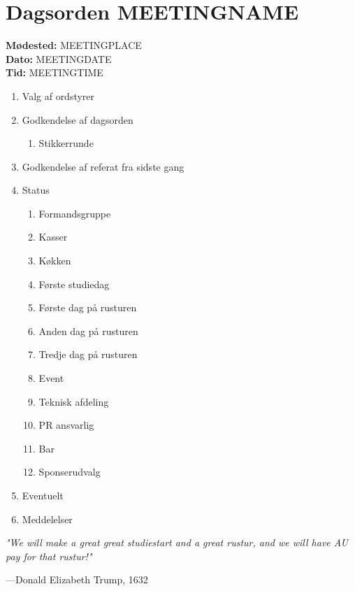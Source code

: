 

\newcommand{\meeting}{MEETINGNAME}
\newcommand{\dato}{MEETINGDATE}
\newcommand{\tid}{MEETINGTIME}
\newcommand{\location}{MEETINGPLACE}



\section*{Dagsorden \meeting{}}
\textbf{Mødested:} \location{}\\
\textbf{Dato:} \dato{}\\
\textbf{Tid:} \tid{}

\begin{enumerate}
  \item Valg af ordstyrer
  \item Godkendelse af dagsorden
  \begin{enumerate}
    \item Stikkerrunde
  \end{enumerate}
  \item Godkendelse af referat fra sidste gang
  \item Status
  \begin{enumerate}
    \item Formandsgruppe
    \item Kasser
    \item Køkken
    \item Første studiedag
    \item Første dag på rusturen
    \item Anden dag på rusturen
    \item Tredje dag på rusturen
    \item Event
    \item Teknisk afdeling
    \item PR ansvarlig
    \item Bar
    \item Sponserudvalg
  \end{enumerate}
  \item Eventuelt
  \item Meddelelser
\end{enumerate}



\vspace{2em}
\begin{minipage}{0.55\textwidth}
  \color{gray}\footnotesize\textit{"We will make a great great studiestart and a great rustur, and we will have AU pay for that rustur!"}

  \raggedleft\----Donald Elizabeth Trump, 1632
\end{minipage}


